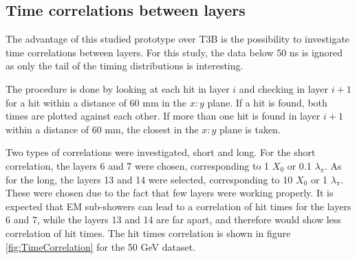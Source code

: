 \subsection{Time correlations between layers}

The advantage of this studied prototype over T3B is the possibility to investigate time correlations between layers. For this study, the data below 50 ns is ignored as only the tail of the timing distributions is interesting.

The procedure is done by looking at each hit in layer $i$ and checking in layer $i+1$ for a hit within a distance of 60 mm in the $x:y$ plane. If a hit is found, both times are plotted against each other. If more than one hit is found in layer $i+1$ within a distance of 60 mm, the closest in the $x:y$ plane is taken.

Two types of correlations were investigated, short and long. For the short correlation, the layers 6 and 7 were chosen, corresponding to 1 $X_0$ or 0.1 $\lambda_{\pi}$. As for the long, the layers 13 and 14 were selected, corresponding to 10 $X_0$ or 1 $\lambda_{\pi}$. These were chosen due to the fact that few layers were working properly. It is expected that EM sub-showers can lead to a correlation of hit times for the layers 6 and 7, while the layers 13 and 14 are far apart, and therefore would show less correlation of hit times. The hit times correlation is shown in figure \ref{fig:TimeCorrelation} for the 50 GeV dataset.

